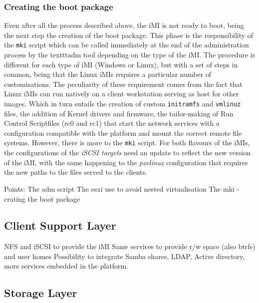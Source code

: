 \subsubsection{Creating the boot package}
\label{subsub:createboot_imi}

Even after all the process described above, the iMI is not ready to boot, being the next step the creation of the boot package. This phase is the responsibility of the \texttt{mki} script which can be called immediately at the end of the administration process by the texttt{adm} tool depending on the type of the iMI.
The procedure is different for each type of iMI (Windows or Linux), but with a set of steps in common, being that the Linux iMIs requires a particular number of customisations. The peculiarity of these requirement comes from the fact that Linux iMIs can run natively on a client workstation serving as host for other images. Which in turn entails the creation of custom \texttt{initramfs} and \texttt{vmlinuz} files, the addition of Kernel drivers and firmware, the tailor-making of Run Control Scriptfiles (rc0 and rc1) that start the network services with a configuration compatible with the platform and mount the correct remote file systems. 
However, there is more to the \texttt{mki} script. For both flavours of the iMIs, the configurations of the \textit{iSCSI targets} need an update to reflect the new version of the iMI, with the same happening to the \textit{pxelinux} configuration that requires the new paths to the files served to the clients.


Points:
The adm script
The esxi use to avoid nested virtualisation
The mki - crating the boot package


\subsection{Client Support Layer}
\label{sub:icbd_architecture_client}

NFS and iSCSI to provide the iMI
Same services to provide r/w space (also btrfs) and user homes
Possibility to integrate Samba shares, LDAP, Active directory, more services embedded in the platform.

\subsection{Storage Layer}
\label{sub:icbd_architecture_storage}

